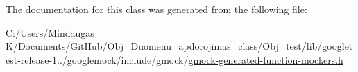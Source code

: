 The documentation for this class was generated from the following file\+:\begin{DoxyCompactItemize}
\item 
C\+:/\+Users/\+Mindaugas K/\+Documents/\+Git\+Hub/\+Obj\+\_\+\+Duomenu\+\_\+apdorojimas\+\_\+class/\+Obj\+\_\+test/lib/googletest-\/release-\/1../googlemock/include/gmock/\mbox{\hyperlink{_obj__test_2lib_2googletest-release-1_88_81_2googlemock_2include_2gmock_2gmock-generated-function-mockers_8h}{gmock-\/generated-\/function-\/mockers.\+h}}\end{DoxyCompactItemize}
